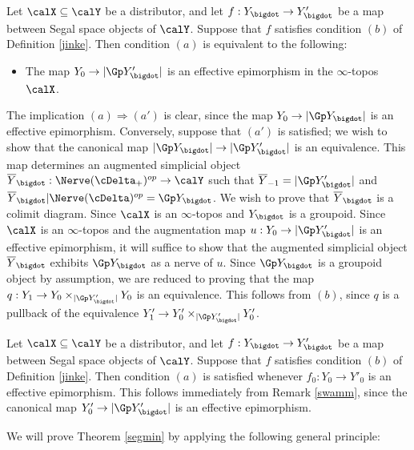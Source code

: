 \begin{remark}\label{swamm}
Let $\calX \subseteq \calY$ be a distributor, and let $f: Y_{\bigdot} \rightarrow Y'_{\bigdot}$ be a map between Segal space objects of $\calY$. Suppose that $f$ satisfies condition $(b)$ of Definition
\ref{jinke}. Then condition $(a)$ is equivalent to the following:
\begin{itemize}
\item[$(a')$] The map $Y_0 \rightarrow | \Gp Y'_\bigdot |$ is an effective epimorphism in the
$\infty$-topos $\calX$.
\end{itemize}
The implication $(a) \Rightarrow (a')$ is clear, since the map $Y_0 \rightarrow | \Gp Y_{\bigdot} |$ is an effective epimorphism. Conversely, suppose that $(a')$ is satisfied; we wish to show that the
canonical map $| \Gp Y_{\bigdot} | \rightarrow | \Gp Y'_{\bigdot} |$ is an equivalence. This map determines an augmented simplicial object $\overline{Y}_{\bigdot}: \Nerve(\cDelta_{+})^{op} \rightarrow \calY$ such that $\overline{Y}_{-1} = | \Gp Y'_{\bigdot} |$ and $\overline{Y}_{\bigdot} | \Nerve(\cDelta)^{op} = \Gp Y_{\bigdot}$. We wish to prove that $\overline{Y}_{\bigdot}$ is a colimit diagram. Since $\calX$ is an $\infty$-topos and $Y_{\bigdot}$ is a groupoid. Since $\calX$ is an $\infty$-topos and
the augmentation map $u: Y_0 \rightarrow | \Gp Y'_{\bigdot} |$ is an effective epimorphism, it will suffice to show that the augmented simplicial object $\overline{Y}_{\bigdot}$ exhibits $\Gp Y_{\bigdot}$
as a \Cech nerve of $u$. Since $\Gp Y_{\bigdot}$ is a groupoid object by assumption, we are reduced to proving that the map
$q: Y_1 \rightarrow Y_0 \times_{ | \Gp Y'_{\bigdot} | } Y_0$ is an equivalence.
This follows from $(b)$, since $q$ is a pullback of the equivalence 
$Y'_1 \rightarrow Y'_0 \times_{ | \Gp Y'_{\bigdot} | } Y'_0$.
\end{remark}

\begin{remark}\label{swammer}
Let $\calX \subseteq \calY$ be a distributor, and let $f: Y_{\bigdot} \rightarrow Y'_{\bigdot}$ be a map between Segal space objects of $\calY$. Suppose that $f$ satisfies condition $(b)$ of Definition
\ref{jinke}. Then condition $(a)$ is satisfied whenever $f_0: Y_0 \rightarrow Y'_0$ is an effective epimorphism. This follows immediately from Remark \ref{swamm}, since the canonical map
$Y'_0 \rightarrow | \Gp Y'_{\bigdot} |$ is an effective epimorphism.
\end{remark}

We will prove Theorem \ref{segmin} by applying the following general principle:

